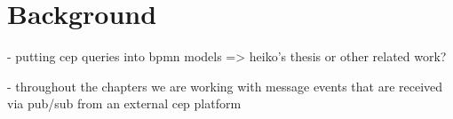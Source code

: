 \chapter{Background}\label{ch:background}

- putting cep queries into bpmn models => heiko's thesis or other related work?

- throughout the chapters we are working with message events that are received via pub/sub from an external cep platform
